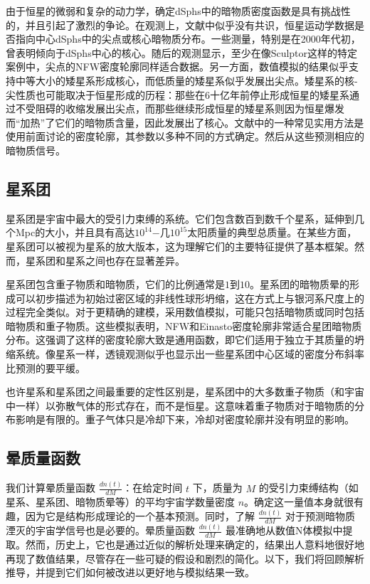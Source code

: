 由于恒星的微弱和复杂的动力学，确定dSphs中的暗物质密度函数是具有挑战性的，并且引起了激烈的争论。在观测上，文献中似乎没有共识，恒星运动学数据是否指向中心dSphs中的尖点或核心暗物质分布。一些测量，特别是在2000年代初，曾表明倾向于dSphs中心的核心。随后的观测显示，至少在像Sculptor这样的特定案例中，尖点的NFW密度轮廓同样适合数据。另一方面，数值模拟的结果似乎支持中等大小的矮星系形成核心，而低质量的矮星系似乎发展出尖点。矮星系的核-尖性质也可能取决于恒星形成的历程：那些在6十亿年前停止形成恒星的矮星系通过不受阻碍的收缩发展出尖点，而那些继续形成恒星的矮星系则因为恒星爆发而“加热”了它们的暗物质含量，因此发展出了核心。文献中的一种常见实用方法是使用前面讨论的密度轮廓，其参数以多种不同的方式确定。然后从这些预测相应的暗物质信号。

\subsection{星系团}

星系团是宇宙中最大的受引力束缚的系统。它们包含数百到数千个星系，延伸到几个Mpc的大小，并且具有高达$10^{14}$−几$10^{15}$太阳质量的典型总质量。在某些方面，星系团可以被视为星系的放大版本，这为理解它们的主要特征提供了基本框架。然而，星系团和星系之间也存在显著差异。

星系团包含重子物质和暗物质，它们的比例通常是$1$到$10$。星系团的暗物质晕的形成可以初步描述为初始过密区域的非线性球形坍缩，这在方式上与银河系尺度上的过程完全类似。对于更精确的建模，采用数值模拟，可能只包括暗物质或同时包括暗物质和重子物质。这些模拟表明，NFW和Einasto密度轮廓非常适合星团暗物质分布。这强调了这样的密度轮廓大致是通用函数，即它们适用于独立于其质量的坍缩系统。像星系一样，透镜观测似乎也显示出一些星系团中心区域的密度分布斜率比预测的要平缓。

也许星系和星系团之间最重要的定性区别是，星系团中的大多数重子物质（和宇宙中一样）以弥散气体的形式存在，而不是恒星。这意味着重子物质对于暗物质的分布影响是有限的。重子气体只是冷却下来，冷却对密度轮廓并没有明显的影响。

\subsection{晕质量函数} 

我们计算晕质量函数 \( \frac{dn(t)}{dM} \)：在给定时间 \( t \) 下，质量为 \( M \) 的受引力束缚结构（如星系、星系团、暗物质晕等）的平均宇宙学数量密度 \( n \)。确定这一量值本身就很有趣，因为它是结构形成理论的一个基本预测。同时，了解 \( \frac{dn(t)}{dM} \) 对于预测暗物质湮灭的宇宙学信号也是必要的。晕质量函数 \( \frac{dn(t)}{dM} \) 最准确地从数值N体模拟中提取。然而，历史上，它也是通过近似的解析处理来确定的，结果出人意料地很好地再现了数值结果，尽管存在一些可疑的假设和剧烈的简化。以下，我们将回顾解析推导，并提到它们如何被改进以更好地与模拟结果一致。

